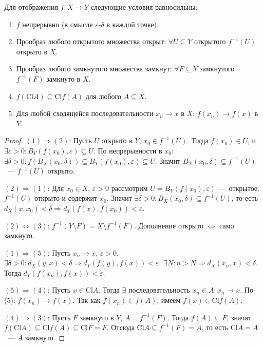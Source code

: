 \documentclass[12pt]{article}
\newcommand{\Cl}{\text{Cl}}
\begin{document}
	\begin{theorem}
		Для отображения $f: X \to Y$ следующие условия равносильны:
		\begin{enumerate}
			\item $f$ непрерывно (в смысле $\varepsilon$-$\delta$ в каждой точке).
			\item Прообраз любого открытого множества открыт: $\forall U \subseteq Y$ открытого $f^{-1}(U)$ открыто в $X$.
			\item Прообраз любого замкнутого множества замкнут: $\forall F \subseteq Y$ замкнутого $f^{-1}(F)$ замкнуто в $X$.
			\item $f(\Cl A) \subseteq \Cl f(A)$ для любого $A \subseteq X$.
			\item Для любой сходящейся последовательности $x_n \to x$ в $X$: $f(x_n) \to f(x)$ в $Y$.
		\end{enumerate}
	\end{theorem}
	
	\begin{proof}
		$(1) \Rightarrow (2)$: Пусть $U$ открыто в $Y$, $x_0 \in f^{-1}(U)$. Тогда $f(x_0) \in U$, и $\exists \varepsilon > 0: B_Y(f(x_0), \varepsilon) \subseteq U$. По непрерывности в $x_0$: $\exists \delta > 0: f(B_X(x_0, \delta)) \subseteq B_Y(f(x_0), \varepsilon) \subseteq U$. Значит $B_X(x_0, \delta) \subseteq f^{-1}(U)$~--- $f^{-1}(U)$ открыто.
		
		$(2) \Rightarrow (1)$: Для $x_0 \in X$, $\varepsilon > 0$ рассмотрим $U = B_Y(f(x_0), \varepsilon)$~--- открытое. $f^{-1}(U)$ открыто и содержит $x_0$. Значит $\exists \delta > 0: B_X(x_0, \delta) \subseteq f^{-1}(U)$, то есть $d_X(x, x_0) < \delta \Rightarrow d_Y(f(x), f(x_0)) < \varepsilon$.
		
		$(2) \Leftrightarrow (3)$: $f^{-1}(Y \setminus F) = X \setminus f^{-1}(F)$. Дополнение открыто $\Leftrightarrow$ само замкнуто.
		
		$(1) \Rightarrow (5)$: Пусть $x_n \to x$, $\varepsilon > 0$. $\exists \delta > 0: d_X(y, x) < \delta \Rightarrow d_Y(f(y), f(x)) < \varepsilon$. $\exists N: n > N \Rightarrow d_X(x_n, x) < \delta$. Тогда $d_Y(f(x_n), f(x)) < \varepsilon$.
		
		$(5) \Rightarrow (4)$: Пусть $x \in \Cl A$. Тогда $\exists$ последовательность $x_n \in A: x_n \to x$. По (5): $f(x_n) \to f(x)$. Так как $f(x_n) \in f(A)$, имеем $f(x) \in \Cl f(A)$.
		
		$(4) \Rightarrow (3)$: Пусть $F$ замкнуто в $Y$, $A = f^{-1}(F)$. Тогда $f(A) \subseteq F$, значит $f(\Cl A) \subseteq \Cl f(A) \subseteq \Cl F = F$. Отсюда $\Cl A \subseteq f^{-1}(F) = A$, то есть $\Cl A = A$~--- $A$ замкнуто.
	\end{proof}
	
\end{document}
